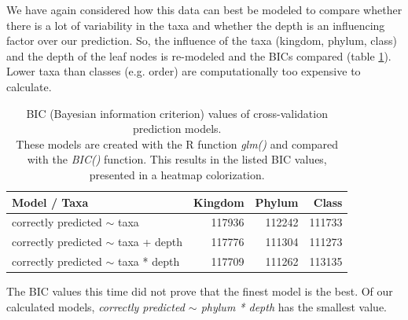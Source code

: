         We have again considered how this data can best be modeled to compare whether there is a lot 
        of variability in the taxa and whether the depth is an influencing factor over our prediction. 
        So, the influence of the taxa (kingdom, phylum, class) and the depth of the leaf nodes is 
        re-modeled and the BICs compared (table \ref{table:BIC cross-validation}). Lower taxa than 
        classes (e.g. order) are computationally too expensive to calculate.


      \begin{table}[h]
        \begin{center}
          \begin{tabular}{ |l|r|r|r| }
            \hline
            \bfseries Model / Taxa & \bfseries Kingdom & \bfseries Phylum & \bfseries Class \\%
            \hline \hline
            correctly predicted $\sim$ taxa & 117936 & \cellcolor{green!40}112242 & \cellcolor{green!50}111733 \\%
            \hline
            correctly predicted $\sim$ taxa + depth & 117776 & \cellcolor{green!50}111304 & \cellcolor{green!50}111273 \\%
            \hline
            correctly predicted $\sim$ taxa * depth & 117709 & \cellcolor{green!50}111262 & \cellcolor{green!30}113135 \\%
            \hline
          \end{tabular} 
        \end{center}
        \caption{BIC (Bayesian information criterion) values of cross-validation prediction models. \\
          These models are created with the R function \textit{glm()} and compared with the 
            \textit{BIC()} function. This results in the listed BIC values, presented in a heatmap colorization.}
        \label{table:BIC cross-validation} 
      \end{table}

      The BIC values this time did not prove that the finest model is the best. Of our calculated models, 
       \textit{correctly predicted $\sim$ phylum * depth} has the smallest value.

